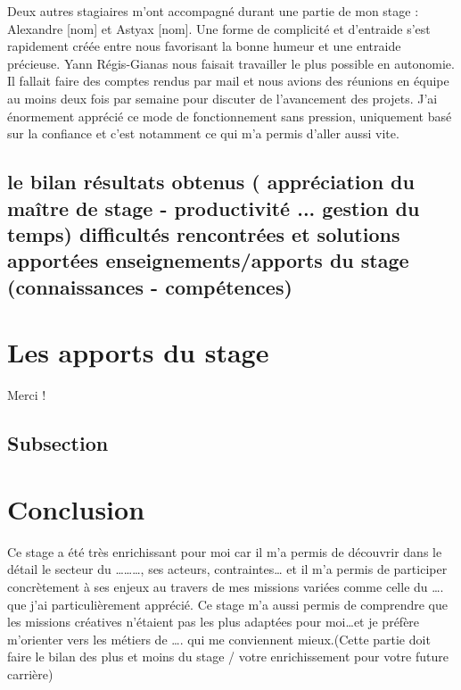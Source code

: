 \documentclass{article}
\begin{document}
Deux autres stagiaires m'ont accompagné durant une partie de mon stage : Alexandre [nom] et Astyax [nom].
\newline
Une forme de complicité et d'entraide s'est rapidement créée entre nous favorisant la bonne humeur et une entraide précieuse.
\newline
Yann Régis-Gianas nous faisait travailler le plus possible en autonomie. Il fallait faire des comptes rendus par mail et nous avions des réunions en équipe au moins deux fois par semaine pour discuter de l'avancement des projets.
\newline
J'ai énormement apprécié ce mode de fonctionnement sans pression, uniquement basé sur la confiance et c'est notamment ce qui m'a permis d'aller aussi vite.

\subsection{le bilan
résultats obtenus ( appréciation du maître de stage - productivité ... gestion du temps)
difficultés rencontrées et solutions apportées
enseignements/apports du stage (connaissances - compétences)}

\newpage

\section{Les apports du stage}
Merci !

\subsection{Subsection}

\newpage

\section{Conclusion}

Ce stage a été très enrichissant pour moi car il m’a permis de découvrir dans le détail le secteur du ………, ses acteurs, contraintes… et il m’a permis de participer concrètement à ses enjeux au travers de mes missions variées comme celle du …. que j’ai particulièrement apprécié. Ce stage m’a aussi permis de comprendre que les missions créatives n’étaient pas les plus adaptées pour moi…et je préfère m’orienter vers les métiers de …. qui me conviennent mieux.(Cette partie doit faire le bilan des plus et moins du stage / votre enrichissement pour votre future carrière)
\end{document}
